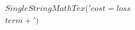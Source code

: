 \documentclass[preview]{standalone}
\begin{document}
\begin{align*}
SingleStringMathTex('cost = loss\\ term +')
\end{align*}
\end{document}
